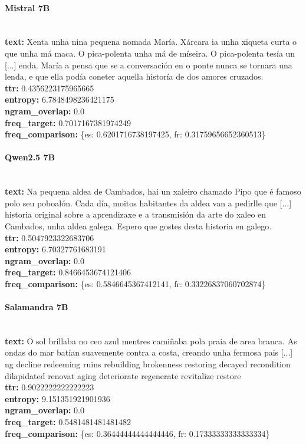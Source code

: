\paragraph{Mistral 7B}~\\
\textbf{text:} Xenta unha nina pequena nomada María. Xárcara ia unha xiqueta curta o que unha má maca. O pica-polenta unha má de míseira. O pica-polenta tesía un [...] enda. María a pensa que se a conversación en o ponte nunca se tornara una lenda, e que ella podía coneter aquella historía de dos amores cruzados.\\
\textbf{ttr:} 0.4356223175965665\\
\textbf{entropy:} 6.7848498236421175\\
\textbf{ngram\_overlap:} 0.0\\
\textbf{freq\_target:} 0.7017167381974249\\
\textbf{freq\_comparison:} \{\textquotesingle{}es\textquotesingle{}: 0.6201716738197425, \textquotesingle{}fr\textquotesingle{}: 0.31759656652360513\}

\paragraph{Qwen2.5 7B}~\\
\textbf{text:} Na pequena aldea de Cambados, hai un xaleiro chamado Pipo que é famoso polo seu poboalón. Cada día, moitos habitantes da aldea van a pedirlle que  [...] historia original sobre a aprendizaxe e a transmisión da arte do xaleo en Cambados, unha aldea galega. Espero que gostes desta historia en galego.\\
\textbf{ttr:} 0.5047923322683706\\
\textbf{entropy:} 6.70327761683191\\
\textbf{ngram\_overlap:} 0.0\\
\textbf{freq\_target:} 0.8466453674121406\\
\textbf{freq\_comparison:} \{\textquotesingle{}es\textquotesingle{}: 0.5846645367412141, \textquotesingle{}fr\textquotesingle{}: 0.33226837060702874\}

\paragraph{Salamandra 7B}~\\
\textbf{text:} O sol brillaba no ceo azul mentres camiñaba pola praia de area branca. As ondas do mar batían suavemente contra a costa, creando unha fermosa pais [...] ng decline redeeming ruins rebuilding brokenness restoring decayed recondition dilapidated renovat aging deteriorate regenerate revitalize restore\\
\textbf{ttr:} 0.9022222222222223\\
\textbf{entropy:} 9.151351921901936\\
\textbf{ngram\_overlap:} 0.0\\
\textbf{freq\_target:} 0.5481481481481482\\
\textbf{freq\_comparison:} \{\textquotesingle{}es\textquotesingle{}: 0.36444444444444446, \textquotesingle{}fr\textquotesingle{}: 0.17333333333333334\}

